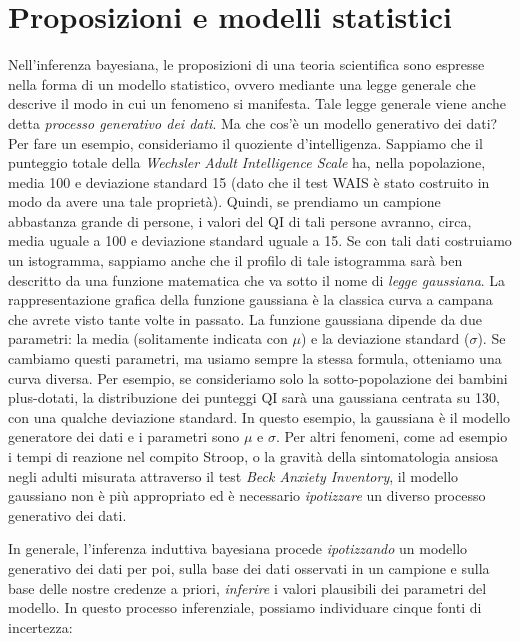 \documentclass[
  11pt,
]{krantz}
\theoremstyle{definition}
\theoremstyle{definition}
\theoremstyle{definition}
\theoremstyle{definition}
\theoremstyle{remark}
\begin{document}
\hypertarget{proposizioni-e-modelli-statistici}{%
\section{Proposizioni e modelli statistici}\label{proposizioni-e-modelli-statistici}}

Nell'inferenza bayesiana, le proposizioni di una teoria scientifica sono espresse nella forma di un modello statistico, ovvero mediante una legge generale che descrive il modo in cui un fenomeno si manifesta. Tale legge generale viene anche detta \emph{processo generativo dei dati}. Ma che cos'è un modello generativo dei dati? Per fare un esempio, consideriamo il quoziente d'intelligenza. Sappiamo che il punteggio totale della \emph{Wechsler Adult Intelligence Scale} ha, nella popolazione, media 100 e deviazione standard 15 (dato che il test WAIS è stato costruito in modo da avere una tale proprietà). Quindi, se prendiamo un campione abbastanza grande di persone, i valori del QI di tali persone avranno, circa, media uguale a 100 e deviazione standard uguale a 15. Se con tali dati costruiamo un istogramma, sappiamo anche che il profilo di tale istogramma sarà ben descritto da una funzione matematica che va sotto il nome di \emph{legge gaussiana}. La rappresentazione grafica della funzione gaussiana è la classica curva a campana che avrete visto tante volte in passato. La funzione gaussiana dipende da due parametri: la media (solitamente indicata con \(\mu\)) e la deviazione standard (\(\sigma\)). Se cambiamo questi parametri, ma usiamo sempre la stessa formula, otteniamo una curva diversa. Per esempio, se consideriamo solo la sotto-popolazione dei bambini plus-dotati, la distribuzione dei punteggi QI sarà una gaussiana centrata su 130, con una qualche deviazione standard. In questo esempio, la gaussiana è il modello generatore dei dati e i parametri sono \(\mu\) e \(\sigma\). Per altri fenomeni, come ad esempio i tempi di reazione nel compito Stroop, o la gravità della sintomatologia ansiosa negli adulti misurata attraverso il test \emph{Beck Anxiety Inventory}, il modello gaussiano non è più appropriato ed è necessario \emph{ipotizzare} un diverso processo generativo dei dati.

In generale, l'inferenza induttiva bayesiana procede \emph{ipotizzando} un modello generativo dei dati per poi, sulla base dei dati osservati in un campione e sulla base delle nostre credenze a priori, \emph{inferire} i valori plausibili dei parametri del modello. In questo processo inferenziale, possiamo individuare cinque fonti di incertezza:
\end{document}
